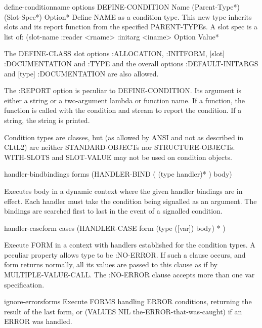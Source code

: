 \begin{macro}{define-condition}{name \rest \rest \body options}
  DEFINE-CONDITION Name (Parent-Type*) (Slot-Spec*) Option*
   Define NAME as a condition type. This new type inherits slots and its
   report function from the specified PARENT-TYPEs. A slot spec is a list of:
     (slot-name :reader <rname> :initarg <iname> {Option Value}*

   The DEFINE-CLASS slot options :ALLOCATION, :INITFORM, [slot] :DOCUMENTATION
   and :TYPE and the overall options :DEFAULT-INITARGS and
   [type] :DOCUMENTATION are also allowed.

   The :REPORT option is peculiar to DEFINE-CONDITION. Its argument is either
   a string or a two-argument lambda or function name. If a function, the
   function is called with the condition and stream to report the condition.
   If a string, the string is printed.

   Condition types are classes, but (as allowed by ANSI and not as described in
   CLtL2) are neither STANDARD-OBJECTs nor STRUCTURE-OBJECTs. WITH-SLOTS and
   SLOT-VALUE may not be used on condition objects.
\end{macro}

\begin{macro}{handler-bind}{bindings \body forms}
  (HANDLER-BIND ( {(type handler)}* )  body)

Executes body in a dynamic context where the given handler bindings are in
effect. Each handler must take the condition being signalled as an argument.
The bindings are searched first to last in the event of a signalled
condition.
\end{macro}

\begin{macro}{handler-case}{form \rest cases}
  (HANDLER-CASE form { (type ([var]) body) }* )

Execute FORM in a context with handlers established for the condition types. A
peculiar property allows type to be :NO-ERROR. If such a clause occurs, and
form returns normally, all its values are passed to this clause as if by
MULTIPLE-VALUE-CALL. The :NO-ERROR clause accepts more than one var
specification.
\end{macro}

\begin{macro}{ignore-errors}{\rest forms}
  Execute FORMS handling ERROR conditions, returning the result of the last
  form, or (VALUES NIL the-ERROR-that-was-caught) if an ERROR was handled.
\end{macro}

